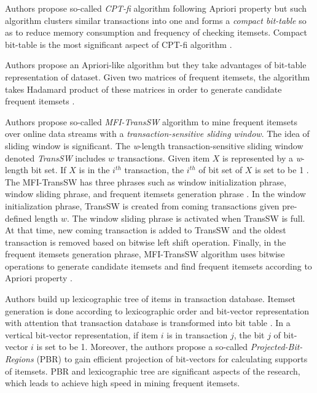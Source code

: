 \documentclass{sig-alternate}
\begin{document}
Authors \cite{raja:bittablefi} propose so-called \textit{CPT-fi} algorithm following Apriori property but such algorithm clusters similar transactions into one and forms a \textit{compact bit-table} so as to reduce memory consumption and frequency of checking itemsets. Compact bit-table is the most significant aspect of CPT-fi algorithm \cite[p.~74]{raja:bittablefi}.

Authors \cite{kiraly:bittable} propose an Apriori-like algorithm but they take advantages of bit-table representation of dataset. Given two matrices of frequent itemsets, the algorithm takes Hadamard product of these matrices in order to generate candidate frequent itemsets \cite[p.~4]{kiraly:bittable}.

Authors \cite{li:slidingwindow} propose so-called \textit{MFI-TransSW} algorithm to mine frequent itemsets over online data streams with a \textit{transaction-sensitive sliding window}. The idea of sliding window is significant. The \textit{w}-length transaction-sensitive sliding window denoted \textit{TransSW} includes $w$ transactions. Given item $X$ is represented by a \textit{w}-length bit set. If $X$ is in the $i^{th}$ transaction, the $i^{th}$ of bit set of $X$ is set to be 1 \cite[p.~2674]{li:slidingwindow}. The MFI-TransSW has three phrases such as window initialization phrase, window sliding phrase, and frequent itemsets generation phrase \cite[p.~2674]{li:slidingwindow}. In the window initialization phrase, TransSW is created from coming transactions given pre-defined length $w$. The window sliding phrase is activated when TransSW is full. At that time, new coming transaction is added to TransSW and the oldest transaction is removed based on bitwise left shift operation. Finally, in the frequent itemsets generation phrase, MFI-TransSW algorithm uses bitwise operations to generate candidate itemsets and find frequent itemsets according to Apriori property \cite[p.~2675]{li:slidingwindow}.

Authors \cite{bashir:fast} build up lexicographic tree of items in transaction database. Itemset generation is done according to lexicographic order and bit-vector representation with attention that transaction database is transformed into bit table \cite[p.~8]{bashir:fast}. In a vertical bit-vector representation, if item $i$ is in transaction $j$, the bit $j$ of bit-vector $i$ is set to be 1. Moreover, the authors \cite[pp.~9-10]{bashir:fast} propose a so-called \textit{Projected-Bit-Regions} (PBR) to gain efficient projection of bit-vectors for calculating supports of itemsets. PBR and lexicographic tree are significant aspects of the research, which leads to achieve high speed in mining frequent itemsets.
\end{document}
